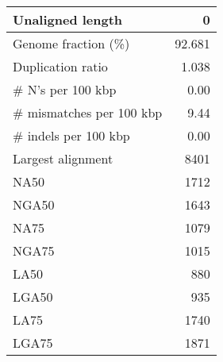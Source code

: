 \documentclass[12pt,a4paper]{article}
\begin{document}
\begin{table}[ht]
\begin{center}
\begin{tabular}{|l*{1}{|r}|}
Unaligned length & 0 \\ \hline
Genome fraction (\%) & 92.681 \\ \hline
Duplication ratio & 1.038 \\ \hline
\# N's per 100 kbp & 0.00 \\ \hline
\# mismatches per 100 kbp & 9.44 \\ \hline
\# indels per 100 kbp & 0.00 \\ \hline
Largest alignment & 8401 \\ \hline
NA50 & 1712 \\ \hline
NGA50 & 1643 \\ \hline
NA75 & 1079 \\ \hline
NGA75 & 1015 \\ \hline
LA50 & 880 \\ \hline
LGA50 & 935 \\ \hline
LA75 & 1740 \\ \hline
LGA75 & 1871 \\ \hline
\end{tabular}
\end{center}
\end{table}
\end{document}
